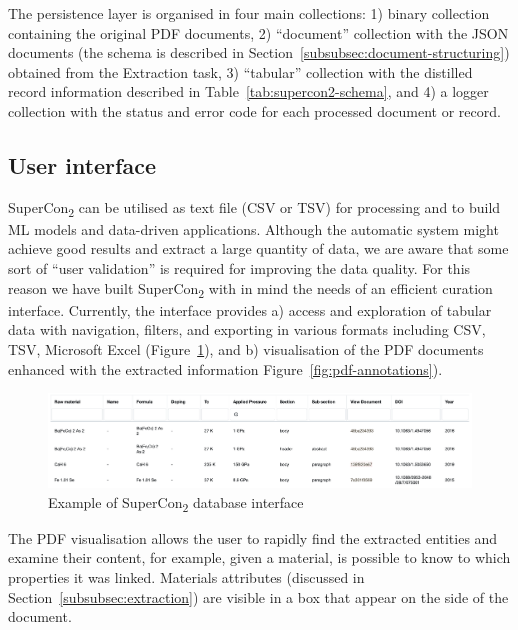 \documentclass{article}
\begin{document}
The persistence layer is organised in four main collections: 1) binary collection containing the original PDF documents, 2) ``document'' collection with the JSON documents (the schema is described in Section~\ref{subsubsec:document-structuring}) obtained from the Extraction task, 3) ``tabular'' collection with the distilled record information described in Table~\ref{tab:supercon2-schema}, and 4) a logger collection with the status and error code for each processed document or record. 

\subsection{User interface}
\label{sucsec:supercon2-user-interface}
SuperCon\textsubscript{2} can be utilised as text file (CSV or TSV) for processing and to build ML models and data-driven applications. 
Although the automatic system might achieve good results and extract a large quantity of data, we are aware that some sort of ``user validation'' is required for improving the data quality. For this reason we have built SuperCon\textsubscript{2} with in mind the needs of an efficient curation interface. 
Currently, the interface provides a) access and exploration of tabular data with navigation, filters, and exporting in various formats including CSV, TSV, Microsoft Excel (Figure~\ref{fig:interface-supercon2}), and b) visualisation of the PDF documents enhanced with the extracted information Figure~\ref{fig:pdf-annotations}). 

\begin{figure}[ht]
\includegraphics[width=\textwidth]{sample-database-3}
\caption{\label{fig:interface-supercon2} Example of SuperCon\textsubscript{2} database interface}
\end{figure}

The PDF visualisation allows the user to rapidly find the extracted entities and examine their content, for example, given a material, is possible to know to which properties it was linked.
Materials attributes (discussed in Section~\ref{subsubsec:extraction}) are visible in a box that appear on the side of the document. 
\end{document}

